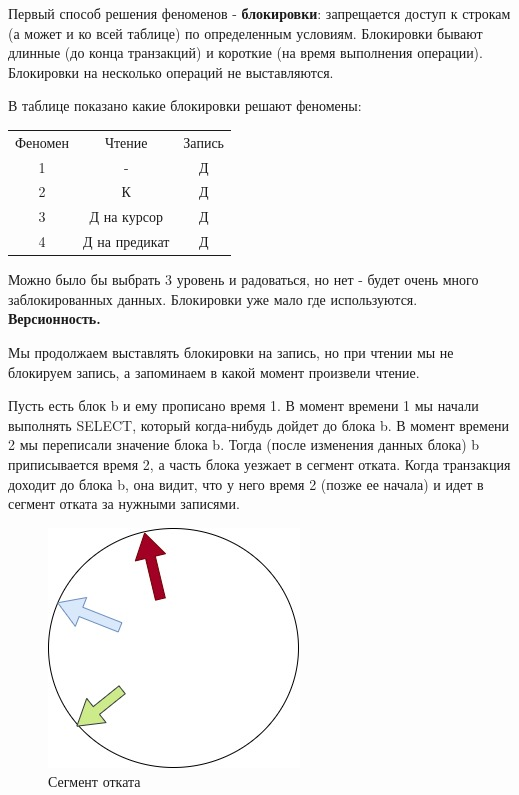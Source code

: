 Первый способ решения феноменов - \textbf{блокировки}: запрещается доступ к строкам (а может и ко всей таблице) по определенным условиям. Блокировки бывают длинные (до конца транзакций) и короткие (на время выполнения операции). Блокировки на несколько операций не выставляются. 

В таблице показано какие блокировки решают феномены:

\begin{center}
	\begin{tabular}{c|c c}
		Феномен & Чтение & Запись \\
		1 & - & Д \\
		2 & К & Д\\
		3 & Д на курсор & Д \\
		4 & Д на предикат & Д\\
	\end{tabular}
\end{center}

Можно было бы выбрать 3 уровень и радоваться, но нет - будет очень много заблокированных данных. Блокировки уже мало где используются. 
\\[20pt]
\textbf{Версионность.} 

Мы продолжаем выставлять блокировки на запись, но при чтении мы не блокируем запись, а запоминаем в какой момент произвели чтение. 

Пусть есть блок b и ему прописано время 1. В момент времени 1 мы начали выполнять SELECT, который когда-нибудь дойдет до блока b. В момент времени 2 мы переписали значение блока b. Тогда (после изменения данных блока) b приписывается время 2, а часть блока уезжает в сегмент отката. Когда транзакция доходит до блока b, она видит, что у него время 2 (позже ее начала) и идет в сегмент отката за нужными записями. 

\begin{figure}[H]
	\centering
	\includegraphics[scale = 0.5]{6/vers.jpg}
	\caption{Сегмент отката}
	\label{fig:vers}
	
\end{figure}

